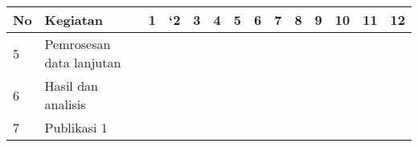 \begin{spacing}{1.5}
\begin{table}[htp]
\begin{tabular}{|l|l|llllllllllll|}
			\multicolumn{1}{|c|}{\multirow{-2}{*}{No}} & \multirow{-2}{*}{Kegiatan}                                                           & \multicolumn{1}{c|}{1}                        & \multicolumn{1}{c|}{`2}                       & \multicolumn{1}{c|}{3}                        & \multicolumn{1}{c|}{4}                        & \multicolumn{1}{c|}{5}                        & \multicolumn{1}{c|}{6}                        & \multicolumn{1}{c|}{7}                        & \multicolumn{1}{c|}{8}                        & \multicolumn{1}{c|}{9}                        & \multicolumn{1}{c|}{10}                       & \multicolumn{1}{c|}{11}                       & \multicolumn{1}{c|}{12}  \\ \hline
			5                                          & Pemrosesan data lanjutan                                                             & \multicolumn{1}{l|}{\cellcolor[HTML]{343434}} & \multicolumn{1}{l|}{\cellcolor[HTML]{343434}} & \multicolumn{1}{l|}{}                         & \multicolumn{1}{l|}{}                         & \multicolumn{1}{l|}{}                         & \multicolumn{1}{l|}{}                         & \multicolumn{1}{l|}{}                         & \multicolumn{1}{l|}{}                         & \multicolumn{1}{l|}{}                         & \multicolumn{1}{l|}{}                         & \multicolumn{1}{l|}{}                         &                          \\ \hline
			6                                          & Hasil dan analisis                                                                   & \multicolumn{1}{l|}{}                         & \multicolumn{1}{l|}{}                         & \multicolumn{1}{l|}{\cellcolor[HTML]{343434}} & \multicolumn{1}{l|}{\cellcolor[HTML]{343434}} & \multicolumn{1}{l|}{}                         & \multicolumn{1}{l|}{}                         & \multicolumn{1}{l|}{}                         & \multicolumn{1}{l|}{}                         & \multicolumn{1}{l|}{}                         & \multicolumn{1}{l|}{}                         & \multicolumn{1}{l|}{}                         &                          \\ \hline
			7                                          & Publikasi 1                                                                          & \multicolumn{1}{l|}{}                         & \multicolumn{1}{l|}{}                         & \multicolumn{1}{l|}{}                         & \multicolumn{1}{l|}{}                         & \multicolumn{1}{l|}{\cellcolor[HTML]{343434}} & \multicolumn{1}{l|}{\cellcolor[HTML]{343434}} & \multicolumn{1}{l|}{\cellcolor[HTML]{343434}} & \multicolumn{1}{l|}{}                         & \multicolumn{1}{l|}{}                         & \multicolumn{1}{l|}{}                         & \multicolumn{1}{l|}{}                         &                          \\ \hline

\end{tabular}
\end{table}
\end{spacing}
